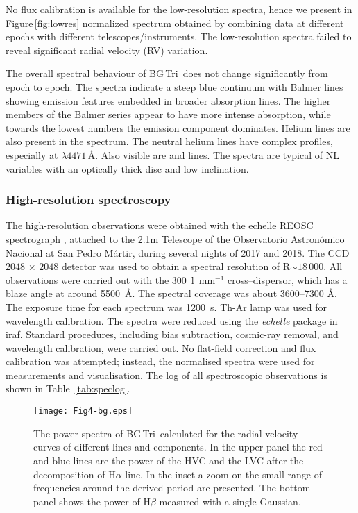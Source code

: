 \documentclass[fleqn,usenatbib]{mnras}
\def\bg{BG\,Tri}
\begin{document}
No flux calibration is available for the low-resolution spectra, hence we present in Figure\,\ref{fig:lowres} normalized spectrum
obtained by combining data at different epochs with different telescopes/instruments. The low-resolution  spectra failed to reveal 
significant radial velocity (RV)  variation. 

The overall spectral behaviour of 
\bg\ does not change significantly from epoch to epoch. The spectra indicate a steep blue continuum with Balmer lines showing emission features embedded in broader absorption lines. 
The higher members of the Balmer series appear to have  more intense absorption, while towards the lowest numbers the emission component
dominates. Helium lines are also present in the spectrum. The neutral helium lines 
have complex profiles, especially at  $\lambda4471$\,\AA. Also visible are  and  lines. 
The spectra are typical of NL variables  with an optically thick disc and low inclination. 


\subsubsection{High-resolution spectroscopy}

The high-resolution observations were obtained with the echelle REOSC
spectrograph \citep{Levine1995}, attached to the 2.1m Telescope of the Observatorio Astron\'omico Nacional 
at San Pedro M\'artir, during several nights of 2017 and  2018. The 
CCD $2048\,\times\,2048$ detector was used to obtain a spectral resolution of R${\sim}18\,000$. All  observations were carried out with the
300~{l}~mm$^{-1}$ cross--dispersor, which has a blaze angle at around 5500~\AA. The spectral coverage was about $3600$--$7300 $ \AA. The
exposure time for each spectrum was 1200~s.  Th-Ar lamp was used for wavelength calibration. The spectra were reduced using the {\it
echelle} package in {\sc iraf}.   Standard procedures, including bias subtraction, cosmic-ray removal, and wavelength  calibration, were
carried out.
No flat-field correction and flux calibration was attempted; instead, the normalised spectra were used for measurements and visualisation.  The log of all 
spectroscopic observations is shown in Table~\ref{tab:speclog}.

\begin{figure}
\texttt{[image: Fig4-bg.eps]}
\caption{
 The power spectra  of  \bg\ calculated for the  radial velocity curves of different lines and components.  In the upper panel the red and
 blue lines are the power of the HVC and the LVC after the  decomposition of  H$\alpha$ line. In the inset a zoom on the small range of
 frequencies around the derived period are presented. The bottom panel shows the power of H$\beta$  measured with a single Gaussian. }
\label{fig:power}
\end{figure}
\end{document}
